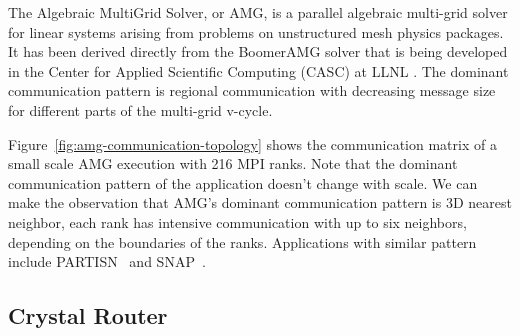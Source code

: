 
The Algebraic MultiGrid Solver, or AMG, 
is a parallel algebraic multi-grid solver for linear systems arising from problems on unstructured mesh physics packages. 
It has been derived directly from the BoomerAMG solver 
that is being developed in the Center for Applied Scientific Computing (CASC) at LLNL \cite{amg}. 
The dominant communication pattern is regional communication 
with decreasing message size for different parts of the multi-grid v-cycle.

Figure~\ref{fig:amg-communication-topology} shows the communication matrix 
of a small scale AMG execution with 216 MPI ranks. 
Note that the dominant communication pattern of the application doesn't change with scale. 
We can make the observation that AMG's dominant communication pattern is 3D nearest neighbor, 
each rank has intensive communication with up to six neighbors, 
depending on the boundaries of the ranks. 
Applications with similar pattern include PARTISN~\cite{partisn} and SNAP~\cite{snap}.


\subsection{Crystal Router}
\label{sec:crystalrouter}

